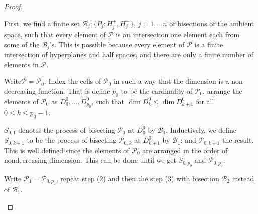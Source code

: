 \begin{proof}
\setcounter{step}{0}
\begin{step}%
First, we find a finite set $\mathscr{B}_{j}:\{P_{j};H^{+}_{j},H^{-}_{j}\}$, $j=1,\ldots n$ of bisections of the ambient space, such that every element of $\mathscr{P}$ is an intersection one element each from some of the $\mathscr{B}_{j}$'s. This is possible because every element of $\mathscr{P}$ is a finite intersection of hyperplanes and half spaces, and there are only a finite number of elements in $\mathscr{P}$.  
\end{step}

\begin{step}%
Write\pageoriginale $\mathscr{P}=\mathscr{P}_{0}$. Index the cells of $\mathscr{P}_{0}$ in such a way that the dimension is a non decreasing function. That is define $p_{0}$ to be the cardinality of $\mathscr{P}_{0}$, arrange the elements of $\mathscr{P}_{0}$ as $D^{0}_{0},\ldots,D^{0}_{p_{0}}$, such that $\dim D^{0}_{k}\leq \dim D^{0}_{k+1}$ for all $0\leq k\leq p_{0}-1$. 
\end{step}

\begin{step}%
$S_{0,1}$ denotes the process of bisecting $\mathscr{P}_{0}$ at $D^{0}_{0}$ by $\mathscr{B}_{1}$. Inductively, we define $S_{0,k+1}$ to be the process of bisecting $\mathscr{P}_{0,k}$ at $D^{0}_{k+1}$ by $\mathscr{B}_{1}$; and $\mathscr{P}_{0,k+1}$ the result. This is well defined since the elements of $\mathscr{P}_{0}$ are arranged in the order of nondecreasing dimension. This can be done until we get $S_{0,p_{0}}$ and $\mathscr{P}_{0,p_{0}}$. 
\end{step}

\begin{step}%
Write $\mathscr{P}_{1}=\mathscr{P}_{0,p_{0}}$, repeat step (2) and then the step (3) with bisection $\mathscr{B}_{2}$ instead of $\mathscr{B}_{1}$. 
\end{step}


\end{proof}
